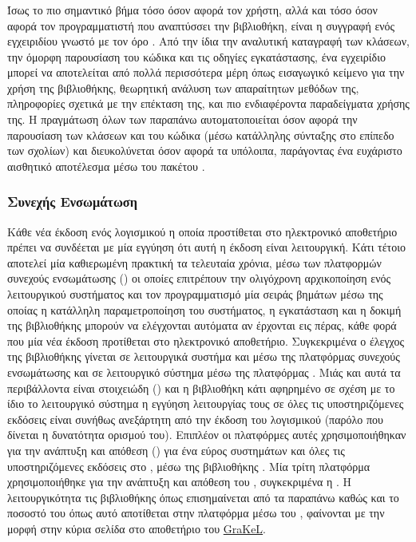 \subsubsection{}
Ίσως το πιο σημαντικό βήμα τόσο όσον αφορά τον χρήστη, αλλά και τόσο όσον αφορά τον προγραμματιστή που αναπτύσσει την βιβλιοθήκη, είναι η συγγραφή ενός εγχειριδίου γνωστό με τον όρο \textit{}.
Από την ίδια την αναλυτική καταγραφή των κλάσεων, την όμορφη παρουσίαση του κώδικα και τις οδηγίες εγκατάστασης, ένα εγχειρίδιο μπορεί να αποτελείται από πολλά περισσότερα μέρη όπως εισαγωγικό κείμενο για την χρήση της βιβλιοθήκης, θεωρητική ανάλυση των απαραίτητων μεθόδων της, πληροφορίες σχετικά με την επέκταση της, και πιο ενδιαφέροντα παραδείγματα χρήσης της.
Η πραγμάτωση όλων των παραπάνω αυτοματοποιείται όσον αφορά την παρουσίαση των κλάσεων και του κώδικα (μέσω κατάλληλης σύνταξης στο επίπεδο των σχολίων) και διευκολύνεται όσον αφορά τα υπόλοιπα, παράγοντας ένα ευχάριστο αισθητικό αποτέλεσμα μέσω του πακέτου \href{https://pypi.org/project/Sphinx/}{}.
\subsubsection{Συνεχής Ενσωμάτωση}
Κάθε νέα έκδοση ενός λογισμικού η οποία προστίθεται στο ηλεκτρονικό αποθετήριο \texttt{} πρέπει να συνδέεται με μία εγγύηση ότι αυτή η έκδοση είναι λειτουργική.
Κάτι τέτοιο αποτελεί μία καθιερωμένη πρακτική τα τελευταία χρόνια, μέσω των πλατφορμών συνεχούς ενσωμάτωσης () οι οποίες επιτρέπουν την ολιγόχρονη αρχικοποίηση ενός λειτουργικού συστήματος και τον προγραμματισμό μία σειράς βημάτων μέσω της οποίας η κατάλληλη παραμετροποίηση του συστήματος, η εγκατάσταση και η δοκιμή της βιβλιοθήκης μπορούν να ελέγχονται αυτόματα αν έρχονται εις πέρας, κάθε φορά που μία νέα έκδοση προτίθεται στο ηλεκτρονικό αποθετήριο.
Συγκεκριμένα ο έλεγχος της βιβλιοθήκης  γίνεται σε λειτουργικά συστήμα  και  μέσω της πλατφόρμας συνεχούς ενσωμάτωσης \href{https://travis-ci.org/ysig/GraKeL}{} και σε λειτουργικό σύστημα  μέσω της πλατφόρμας \href{https://ci.appveyor.com/project/ysig/grakel}{}.
Μιάς και αυτά τα περιβάλλοντα είναι στοιχειώδη () και η βιβλιοθήκη κάτι αφηρημένο σε σχέση με το ίδιο το λειτουργικό σύστημα η εγγύηση λειτουργίας τους σε όλες τις υποστηριζόμενες εκδόσεις  είναι συνήθως ανεξάρτητη από την έκδοση του λογισμικού (παρόλο που δίνεται η δυνατότητα ορισμού του).
Επιπλέον οι πλατφόρμες αυτές χρησιμοποιήθηκαν για την ανάπτυξη και απόθεση ()  για ένα εύρος συστημάτων και όλες τις υποστηριζόμενες εκδόσεις  στο , μέσω της βιβλιοθήκης \href{}{}.
Μία τρίτη πλατφόρμα χρησιμοποιήθηκε για την ανάπτυξη και απόθεση του , συγκεκριμένα η \href{https://circleci.com/gh/ysig/GraKeL/tree/develop}{}.
Η λειτουργικότητα τις βιβλιοθήκης όπως επισημαίνεται από τα παραπάνω καθώς και το ποσοστό του  όπως αυτό αποτίθεται στην πλατφόρμα \href{}{} μέσω του , φαίνονται με την μορφή  στην κύρια σελίδα στο αποθετήριο του \href{}{GraKeL}.

